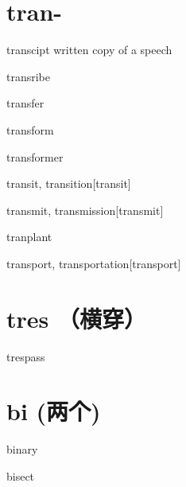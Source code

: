 
\section{tran-}

\begin{wordRef}{transcipt}
    written copy of a speech
\end{wordRef}

\begin{wordRef}{transribe}
\end{wordRef}

\begin{wordRef}{transfer}
\end{wordRef}

\begin{wordRef}{transform}
\end{wordRef}

\begin{wordRef}{transformer}
\end{wordRef}

\begin{wordRef}{transit, transition}[transit]
\end{wordRef}

\begin{wordRef}{transmit, transmission}[transmit]
\end{wordRef}

\begin{wordRef}{tranplant}
\end{wordRef}

\begin{wordRef}{transport, transportation}[transport]
\end{wordRef}

\section{tres （横穿）}

\begin{wordRef}{trespass}
\end{wordRef}

\section{bi (两个)}

\begin{wordRef}{binary}
\end{wordRef}

\begin{wordRef}{bisect}
\end{wordRef}

